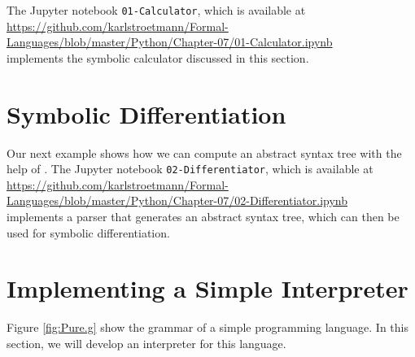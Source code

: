 The Jupyter notebook \texttt{01-Calculator}, which is available at
\\[0.2cm]
\hspace*{0.3cm}
\href{https://github.com/karlstroetmann/Formal-Languages/blob/master/Python/Chapter-07/01-Calculator.ipynb}{https://github.com/karlstroetmann/Formal-Languages/blob/master/Python/Chapter-07/01-Calculator.ipynb}
\\[0.2cm]
implements the symbolic calculator discussed in this section.

\section{Symbolic Differentiation}
Our next example shows how we can compute an abstract syntax tree with the help of .
The Jupyter notebook \texttt{02-Differentiator}, which is available at
\\[0.2cm]
\hspace*{0.3cm}
\href{https://github.com/karlstroetmann/Formal-Languages/blob/master/Python/Chapter-07/02-Differentiator.ipynb}{https://github.com/karlstroetmann/Formal-Languages/blob/master/Python/Chapter-07/02-Differentiator.ipynb}
\\[0.2cm]
implements a parser that generates an abstract syntax tree, which can then be used for symbolic
differentiation.
\pagebreak

\section{Implementing a Simple Interpreter  \label{chapter:interpreter}}
Figure \ref{fig:Pure.g} show the grammar of a simple programming language.  In this section, we will develop an
interpreter for this language.

